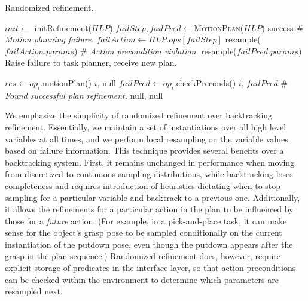 \begin{algorithm}
 \caption{Randomized refinement.} \label{alg-randref}
 \begin{algorithmic}[1]
  \State $init \leftarrow$ initRefinement($HLP$)
  \State $failStep, failPred \leftarrow $\textsc{MotionPlan}($HLP$)
  \State \Return success
  \Else
  \State \# \emph{Motion planning failure.}
  \State $failAction \leftarrow HLP.ops[failStep]$
  \State resample($failAction.params$)
  \Else
  \State \# \emph{Action precondition violation.}
  \State resample($failPred.params$)
  \EndIf
  \EndIf
  \EndFor
  \State Raise failure to task planner, receive new plan.
  \EndProcedure

  \State $res \leftarrow op_{i}$.motionPlan()
  \State \Return $i$, null
  \Else
  \State $failPred \leftarrow op_{i}$.checkPreconds()
  \State \Return $i$, $failPred$
  \Else
  \State \# \emph{Found successful plan refinement.}
  \State \Return null, null
  \EndIf
  \EndIf
  \EndFor
  \EndProcedure
 \end{algorithmic}
\end{algorithm}

We emphasize the simplicity of randomized refinement over backtracking
refinement. Essentially, we maintain a set of instantiations over all high level
variables at all times, and we perform local resampling on the variable values based
on failure information. This technique provides several benefits over a backtracking
system. First, it remains unchanged in performance when moving from discretized to continuous
sampling distributions, while backtracking loses completeness and requires introduction
of heuristics dictating when to stop sampling for a particular variable and backtrack
to a previous one. Additionally, it allows the refinements for a particular action in
the plan to be influenced by those for a \emph{future} action. (For example, in a
pick-and-place task, it can make sense for the object's grasp pose to be sampled
conditionally on the current instantiation of the putdown pose, even though the putdown
appears after the grasp in the plan sequence.) Randomized refinement does, however,
require explicit storage of predicates in the interface layer, so that action preconditions
can be checked within the environment to determine which parameters are resampled next.